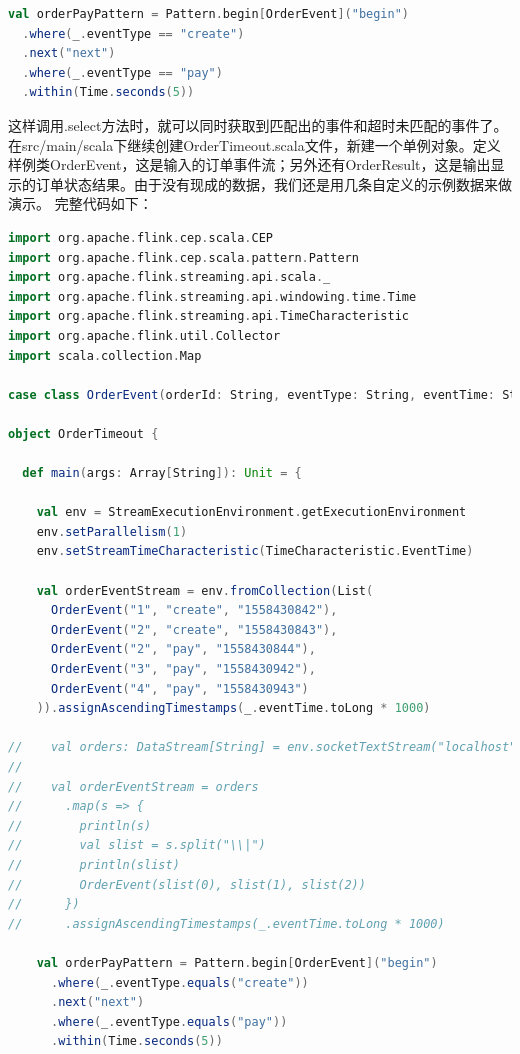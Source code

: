 \documentclass[oneside]{ctexbook}
\begin{document}
\begin{lstlisting}[language=scala]
val orderPayPattern = Pattern.begin[OrderEvent]("begin")
  .where(_.eventType == "create")
  .next("next")
  .where(_.eventType == "pay")
  .within(Time.seconds(5))
\end{lstlisting}

这样调用.select方法时，就可以同时获取到匹配出的事件和超时未匹配的事件了。
在src/main/scala下继续创建OrderTimeout.scala文件，新建一个单例对象。定义样例类OrderEvent，这是输入的订单事件流；另外还有OrderResult，这是输出显示的订单状态结果。由于没有现成的数据，我们还是用几条自定义的示例数据来做演示。
完整代码如下：

\begin{lstlisting}[language=scala]
import org.apache.flink.cep.scala.CEP
import org.apache.flink.cep.scala.pattern.Pattern
import org.apache.flink.streaming.api.scala._
import org.apache.flink.streaming.api.windowing.time.Time
import org.apache.flink.streaming.api.TimeCharacteristic
import org.apache.flink.util.Collector
import scala.collection.Map

case class OrderEvent(orderId: String, eventType: String, eventTime: String)

object OrderTimeout {

  def main(args: Array[String]): Unit = {

    val env = StreamExecutionEnvironment.getExecutionEnvironment
    env.setParallelism(1)
    env.setStreamTimeCharacteristic(TimeCharacteristic.EventTime)

    val orderEventStream = env.fromCollection(List(
      OrderEvent("1", "create", "1558430842"),
      OrderEvent("2", "create", "1558430843"),
      OrderEvent("2", "pay", "1558430844"),
      OrderEvent("3", "pay", "1558430942"),
      OrderEvent("4", "pay", "1558430943")
    )).assignAscendingTimestamps(_.eventTime.toLong * 1000)

//    val orders: DataStream[String] = env.socketTextStream("localhost", 9999)
//
//    val orderEventStream = orders
//      .map(s => {
//        println(s)
//        val slist = s.split("\\|")
//        println(slist)
//        OrderEvent(slist(0), slist(1), slist(2))
//      })
//      .assignAscendingTimestamps(_.eventTime.toLong * 1000)

    val orderPayPattern = Pattern.begin[OrderEvent]("begin")
      .where(_.eventType.equals("create"))
      .next("next")
      .where(_.eventType.equals("pay"))
      .within(Time.seconds(5))


\end{lstlisting}
\end{document}
